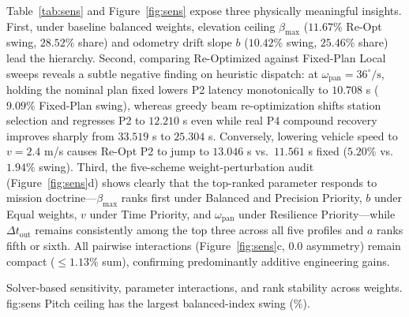Table~\ref{tab:sens} and Figure~\ref{fig:sens} expose three physically meaningful insights. First, under baseline balanced weights, elevation ceiling $\beta_{\max}$ ($11.67\%$ Re-Opt swing, $28.52\%$ share) and odometry drift slope $b$ ($10.42\%$ swing, $25.46\%$ share) lead the hierarchy. Second, comparing Re-Optimized against Fixed-Plan Local sweeps reveals a subtle negative finding on heuristic dispatch: at $\omega_{\mathrm{pan}}=36^\circ/\text{s}$, holding the nominal plan fixed lowers P2 latency monotonically to $10.708$ s ($9.09\%$ Fixed-Plan swing), whereas greedy beam re-optimization shifts station selection and regresses P2 to $12.210$ s even while real P4 compound recovery improves sharply from $33.519$ s to $25.304$ s. Conversely, lowering vehicle speed to $v=2.4$ m/s causes Re-Opt P2 to jump to $13.046$ s vs.\ $11.561$ s fixed ($5.20\%$ vs.\ $1.94\%$ swing). Third, the five-scheme weight-perturbation audit (Figure~\ref{fig:sens}d) shows clearly that the top-ranked parameter responds to mission doctrine—$\beta_{\max}$ ranks first under Balanced and Precision Priority, $b$ under Equal weights, $v$ under Time Priority, and $\omega_{\mathrm{pan}}$ under Resilience Priority—while $\Delta t_{\mathrm{out}}$ remains consistently among the top three across all five profiles and $a$ ranks fifth or sixth. All pairwise interactions (Figure~\ref{fig:sens}c, $0.0$ asymmetry) remain compact ($\le 1.13\%$ sum), confirming predominantly additive engineering gains.

{Solver-based sensitivity, parameter interactions, and rank stability across weights.}
{fig:sens}
{Pitch ceiling has the largest balanced-index swing (\BGlobalTopSwing{}\%).}

